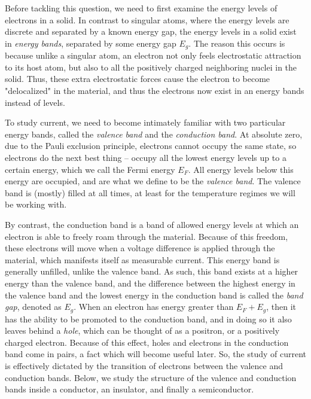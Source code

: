 \documentclass[10pt]{article}
\begin{document}
	Before tackling this question, we need to first examine the energy levels of electrons in a solid. In
	contrast to singular atoms, where the energy levels are discrete and separated by a known energy gap,
	the energy levels in a solid exist in \textit{energy bands}, separated by some energy gap \( E_g \). The
	reason this occurs is because unlike a singular atom, an electron not only feels electrostatic attraction
	to its host atom, but also to all the positively charged neighboring nuclei in the solid. 
	Thus, these extra electrostatic forces cause the electron to become "delocalized" in the material,  
	and thus the electrons now exist in an energy bands instead of levels. 

	To study current, we need to become intimately familiar with two particular energy bands, called the
	\textit{valence band} and the \textit{conduction band}. At absolute zero, due to the Pauli exclusion
	principle, electrons cannot occupy the same state, so electrons do the next best thing -- occupy all the
	lowest energy levels up to a certain energy, which we call the Fermi energy \( E_F \).
	All energy levels below this energy are occupied, and are what we define to be the \textit{valence band}. 
	The valence band is (mostly) filled at all times, at least for the temperature regimes we will be 
	working with. 

	By contrast, the conduction band is a band of allowed energy levels at which an electron is able to
	freely roam through the material. Because of this freedom, these electrons will move when a voltage
	difference is applied through the material, which manifests itself as measurable current. This energy
	band is generally unfilled, unlike the valence band. As such, this band exists at a higher energy than
	the valence band, and the difference between the highest energy in the valence band and the lowest energy
	in the conduction band is called the \textit{band gap}, denoted as \( E_g \). When an electron has energy
	greater than \( E_F + E_g \), then it has the ability to be promoted to the conduction band, and in
	doing so it also leaves behind a \textit{hole}, which can be thought of as a positron, or a positively
	charged electron. Because of this effect, holes and electrons in the conduction band come in pairs, a
	fact which will become useful later.   
	So, the study of current is effectively dictated by the transition of electrons between the valence and 
	conduction bands. Below, we study the structure of the valence and conduction bands inside a conductor, 
	an insulator, and finally a semiconductor.    
\end{document}
